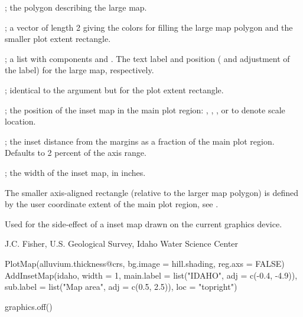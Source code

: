 \documentclass[a4paper]{book}
\begin{document}
\begin{Arguments}
\begin{ldescription}
\item[\code{p}] ; the polygon describing the large map.
\item[\code{col}] ; a vector of length 2 giving the colors for filling the large map polygon  and the smaller plot extent rectangle.
\item[\code{main.label}] ; a list with components  and .
The text label and position ( and  adjustment of the label) for the large map, respectively.
\item[\code{sub.label}] ; identical to the  argument but for the plot extent rectangle.
\item[\code{loc}] ; the position of the inset map in the main plot region: , , , or  to denote scale location.
\item[\code{inset}] ; the inset distance from the margins as a fraction of the main plot region.
Defaults to 2 percent of the axis range.
\item[\code{width}] ; the width of the inset map, in inches.
\end{ldescription}
\end{Arguments}
%
\begin{Details}\relax
The smaller axis-aligned rectangle (relative to the larger map polygon) is defined by the user coordinate extent of the main plot region, see .
\end{Details}
%
\begin{Value}
Used for the side-effect of a inset map drawn on the current graphics device.
\end{Value}
%
\begin{Author}\relax
J.C. Fisher, U.S. Geological Survey, Idaho Water Science Center
\end{Author}
%
\begin{SeeAlso}\relax
{}
\end{SeeAlso}
%
\begin{Examples}
\begin{ExampleCode}
PlotMap(alluvium.thickness@crs, bg.image = hill.shading, reg.axs = FALSE)
AddInsetMap(idaho, width = 1, main.label = list("IDAHO", adj = c(-0.4, -4.9)),
            sub.label = list("Map area", adj = c(0.5, 2.5)), loc = "topright")

graphics.off()
\end{ExampleCode}
\end{Examples}
\end{document}
